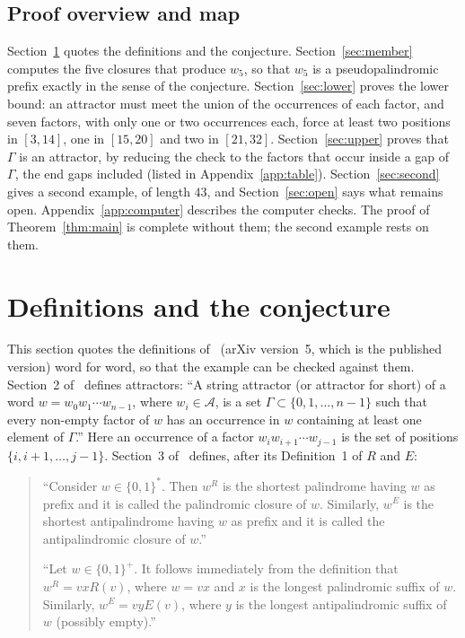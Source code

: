 \documentclass[11pt]{article}
\theoremstyle{remark}
\begin{document}
\subsection*{Proof overview and map}
Section~\ref{sec:defs} quotes the definitions and the conjecture.
Section~\ref{sec:member} computes the five closures that produce $w_5$, so
that $w_5$ is a pseudopalindromic prefix exactly in the sense of the
conjecture. Section~\ref{sec:lower} proves the lower bound: an attractor must
meet the union of the occurrences of each factor, and seven factors, with
only one or two occurrences each, force at least two positions in $[3,14]$,
one in $[15,20]$ and two in $[21,32]$. Section~\ref{sec:upper} proves that
$\Gamma$ is an attractor, by reducing the check to the factors that occur inside a
gap of $\Gamma$, the end gaps included (listed in Appendix~\ref{app:table}). Section~\ref{sec:second} gives a second example,
of length $43$, and Section~\ref{sec:open} says what remains open.
Appendix~\ref{app:computer} describes the computer checks. The proof of
Theorem~\ref{thm:main} is complete without them; the second example rests on
them.

\section{Definitions and the conjecture}\label{sec:defs}

This section quotes the definitions of~\cite{dh} (arXiv version~5, which is
the published version) word for word, so that the example can be checked
against them. Section~2 of~\cite{dh} defines attractors: ``A string attractor
(or attractor for short) of a word $w=w_0w_1\cdots w_{n-1}$, where
$w_i\in\mathcal A$, is a set $\Gamma\subset\{0,1,\dots,n-1\}$ such that every
non-empty factor of $w$ has an occurrence in $w$ containing at least one
element of $\Gamma$.'' Here an occurrence of a factor
$w_iw_{i+1}\cdots w_{j-1}$ is the set of positions $\{i,i+1,\dots,j-1\}$.
Section~3 of~\cite{dh} defines, after its Definition~1 of $R$
and $E$:

\begin{quote}
``Consider $w\in\{0,1\}^*$. Then $w^R$ is the shortest palindrome having $w$
as prefix and it is called the palindromic closure of $w$. Similarly, $w^E$
is the shortest antipalindrome having $w$ as prefix and it is called the
antipalindromic closure of $w$.''

``Let $w\in\{0,1\}^+$. It follows immediately from the definition that
$w^R=vxR(v)$, where $w=vx$ and $x$ is the longest palindromic suffix of $w$.
Similarly, $w^E=vyE(v)$, where $y$ is the longest antipalindromic suffix of
$w$ (possibly empty).''
\end{quote}
\end{document}
